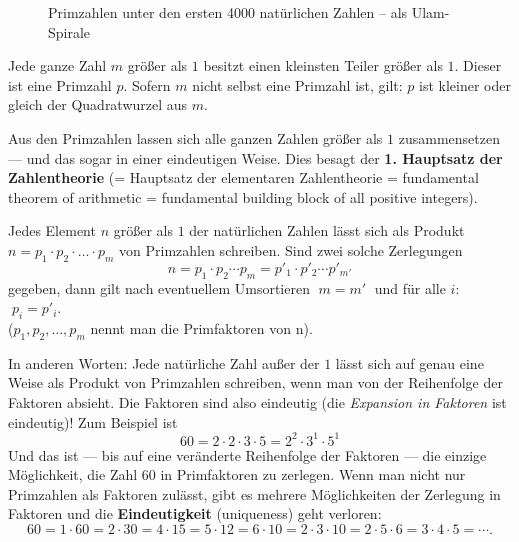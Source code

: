 \begin{refsegment}
\begin{figure}[!hb]
\begin{center}
\caption[Primzahlen unter den ersten 4000 natürlichen Zahlen -- als Ulam-Spirale]
        {Primzahlen unter den ersten 4000 natürlichen Zahlen -- als Ulam-Spirale\protect\footnotemark}
\label{Primes-in-a-4000-integer-ulam-spiral-figure}
\end{center}
\end{figure}



\newpage
\begin{satz}\label{thm-pz-sqr}
Jede ganze Zahl $m$ größer als $1$ besitzt einen kleinsten Teiler größer als $1$.
Dieser ist eine Primzahl $p$. Sofern $m$ nicht selbst eine Primzahl ist, gilt:
$p$ ist kleiner oder gleich der Quadratwurzel aus $m$.
\end{satz}

Aus den Primzahlen lassen sich alle ganzen Zahlen größer als $1$ zusammensetzen --- und das sogar in
einer eindeutigen Weise. Dies besagt der \textbf{1. Hauptsatz der Zahlentheorie} (= Hauptsatz der elementaren Zahlentheorie =
fundamental theorem of arithmetic = fundamental building block of all positive integers).

\begin{satz}\label{thm-pz-prod}
Jedes Element $n$ größer als $1$ der natürlichen Zahlen lässt sich als Produkt
$n = p_1 \cdot p_2 \cdot \dots \cdot p_m$ von Primzahlen schreiben.
Sind zwei solche Zerlegungen
$$n =  p_1 \cdot p_2 \cdots p_m = p'_1 \cdot p'_2 \cdots p'_{m'}$$
gegeben, dann gilt nach eventuellem Umsortieren $\;m = m'\;$ und  für alle $i$:  $\;p_i = p'_i$. \\
($p_1, p_2, \dots, p_m$ nennt man die Primfaktoren von n).
\end{satz}

In anderen Worten: Jede natürliche Zahl außer der $1$ lässt sich auf genau eine Weise als Produkt von
Primzahlen schreiben, wenn man von der Reihenfolge der Faktoren absieht. Die Faktoren sind also
eindeutig (die {\em Expansion in Faktoren} ist eindeutig)!
Zum Beispiel ist
$$ 60 = 2 \cdot 2 \cdot 3 \cdot 5 = 2^2\cdot 3^1 \cdot 5^1 $$
Und das ist --- bis auf eine veränderte Reihenfolge der Faktoren
--- die einzige Möglichkeit, die Zahl $60$ in Primfaktoren zu
zerlegen. Wenn man nicht nur Primzahlen als Faktoren zulässt,
gibt es mehrere Möglichkeiten der Zerlegung in Faktoren und die
\textbf{Eindeutigkeit} (\hypertarget{uniqueness}{uniqueness}) geht verloren:
$$ 60 = 1 \cdot 60 = 2 \cdot 30 = 4 \cdot 15 = 5 \cdot 12 =6 \cdot 10 = 2 \cdot 3 \cdot 10 =
        2 \cdot 5 \cdot 6 = 3 \cdot 4 \cdot 5 = \cdots . $$


\end{refsegment}
